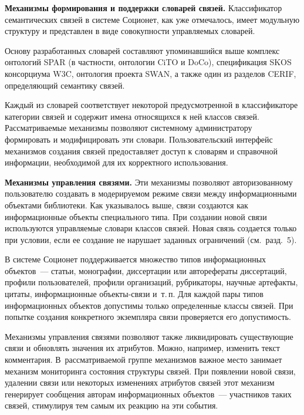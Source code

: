 \begin{multicols}{2}
  \smallskip
  
  \textbf{Механизмы формирования и поддержки словарей связей.} 
Классификатор семантических связей в сис\-те\-ме Соционет, как уже отмечалось, 
имеет модульную структуру и представлен в виде совокупности управляемых 
словарей. 
  
  Основу разработанных словарей составляют упоминавшийся выше комплекс 
онтологий {SPAR} (в частности, онтологии {CiTO} и {DoCo}), 
спецификация {SKOS} консорциума {W3C}, онтология проекта 
{SWAN}, а также один из разделов {CERIF}, опре\-де\-ля\-ющий 
семантику связей. 
  
  Каждый из словарей соответствует некоторой предусмотренной в 
классификаторе категории связей и содержит имена относящихся к ней классов 
связей. Рассматриваемые механизмы позволяют системному администратору 
формировать и модифицировать эти словари. Пользовательский интерфейс 
механизмов создания связей предоставляет доступ к словарям и справочной 
информации, необходимой для их корректного использования. 
  
  \smallskip
  
  \textbf{Механизмы управления связями.} Эти механизмы позволяют 
авторизованному пользователю создавать в модерируемом режиме связи между 
информационными объектами библиотеки. Как указывалось выше, связи 
создаются как информационные объекты специального типа. При создании 
новой связи используются управляемые словари классов связей. Новая связь 
создается только при условии, если ее создание не нарушает заданных 
ограничений (см.\ разд.~5). 
  
  В системе Соционет поддерживается множество типов информационных 
объектов~--- статьи, монографии, диссертации или авторефераты диссертаций, 
профили пользователей, профили организаций, рубрикаторы, научные 
артефакты, цитаты, информационные объек\-ты-свя\-зи и~т.\,п. Для каждой 
пары типов информационных объектов допустимы только определенные 
классы связей. При попытке создания конкретного экземпляра связи 
проверяется его допустимость. 
  
  Механизмы управления связями позволяют также ликвидировать 
существующие связи и обновлять значения их атрибутов. Можно, например, 
изменить текст комментария. В~рассматриваемой группе механизмов важное 
место занимает механизм мониторинга состояния структуры связей. При 
появлении новой связи, удалении связи или некоторых изменениях атрибутов 
связей этот механизм генерирует сообщения авторам информационных 
объектов~--- участников таких связей, стимулируя тем самым их реакцию на 
эти события. 
  

\end{multicols}
